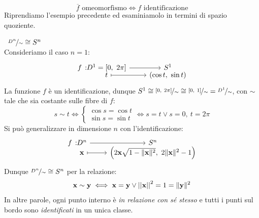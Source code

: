 \begin{equation}
	\overline{f} \text{ omeomorfismo} \iff f \text{ identificazione}
\end{equation}
\vspace{-1.5mm}\noindent Riprendiamo l'esempio precedente ed esaminiamolo in termini di spazio quoziente.
\begin{example}~{$\nicefrac{D^n}{\sim}\cong S^n$}\\
	Consideriamo il caso $n=1$:
	\begin{equation*}
		\funztot f {D^1=[0, \ 2\pi]} {S^1} t {(\cos t, \ \sin t)}
	\end{equation*}
	La funzione $f$ è un identificazione, dunque $S^1\cong \nicefrac{[0, \ 2\pi]}{\sim}\cong \nicefrac{[0, \ 1]}{\sim}=\nicefrac{D^1}{\sim}$, con $\sim$ tale che sia costante sulle fibre di $f$:
	\begin{equation*}
		 s\sim t \iff \begin{cases}
			\cos s=\cos t \\
			\sin s =\sin t
		\end{cases} \iff s=t  \vee s=0,\ t=2\pi
	\end{equation*} \newline
	Si può generalizzare in dimensione $n$ con l'identificazione:
	\begin{equation*}
		\funztot f {D^n} {S^n} {\mathbf{x}} {\left( 2\mathbf{x}\sqrt{1- \| \mathbf{x} \|^2}, \ 2\| \mathbf{x}\|^2 -1 \right)}
	\end{equation*}
	Dunque $\nicefrac{D^n}{\sim}\cong S^n$ per la relazione:
\begin{equation*}
	\mathbf{x}\sim \mathbf{y} \iff \mathbf{x}=\mathbf{y} \vee \left|\left| \mathbf{x} \right|\right| ^2 = 1 = \| \mathbf{y} \| ^2
\end{equation*}
	In altre parole, ogni punto interno è \textit{in relazione con sé stesso} e tutti i punti sul bordo sono \textit{identificati} in un unica classe.
\end{example}
	
